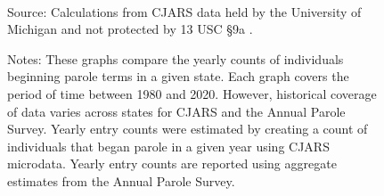 \begin{figure}

\begin{minipage}{\linewidth}~\\ \small
Source: Calculations from CJARS data held by the University of Michigan and not protected by 13 USC \S 9a \cite{papp2021}.

Notes: These graphs compare the yearly counts of individuals beginning parole terms in a given state. Each graph covers the period of time between 1980 and 2020. However, historical coverage of data varies across states for CJARS and the Annual Parole Survey. Yearly entry counts were estimated by creating a count of individuals that began parole in a given year using CJARS microdata. Yearly entry counts are reported using aggregate estimates from the Annual Parole Survey.
\end{minipage}
\end{figure}
